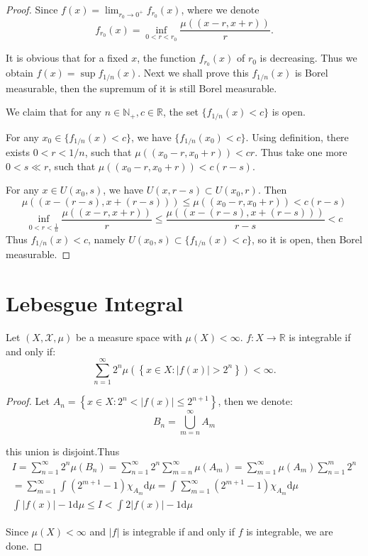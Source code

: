 \begin{proof}
	Since $ f(x)=\lim_{r_{0}\to 0^{+}}f_{r_{0}}( x ) $, where we denote
	$$ f_{r_{0}}( x ) =\inf_{0<r<r_{0}}\frac{\mu ( ( x-r,x+r ) )}{r}.
	$$

	It is obvious that for a fixed $ x $, the function $ f_{r_{0}}(x) $ of $ r_{0} $ is decreasing. Thus we obtain $
		f( x ) =\sup f_{1/n}( x )
	$. Next we shall prove this $ f_{1/n}(x) $ is Borel measurable, then the supremum of it is still Borel measurable.

	We claim that for any $ n\in \mathbb{N}_{+},c\in \mathbb{R} $, the set $ \{f_{1/n}(x)<c\} $ is open.

	For any $ x_{0}\in \{f_{1/n}(x)<c\} $, we have $ \{f_{1/n}(x_{0})<c\} $.
	Using definition, there exists $ 0<r<1/n $, such that $ \mu((x_{0}-r,x_{0}+r))<cr $.
	Thus take  one more $ 0<s \ll r $, such that $ \mu((x_{0}-r,x_{0}+r))<c(r-s) $.

	For any $ x\in U(x_{0},s) $, we have $ U(x,r-s)\subset U(x_{0},r) $. Then
	$$ \mu((x-(r-s),x+(r-s)))\le \mu((x_{0}-r,x_{0}+r))<c(r-s) $$
	$$
		\inf_{0<r<\frac{1}{n}}\frac{\mu ( ( x-r,x+r ) )}{r}\le \frac{\mu ( ( x-( r-s ) ,x+( r-s ) ) )}{r-s}<c
	$$
	Thus $ f_{1/n}(x)<c $, namely $
		U( x_0,s ) \subset \{ f_{1/n}( x ) <c \}
	$, so it is open, then Borel measurable.
\end{proof}

\section*{Lebesgue Integral}

\begin{problem}
Let $ (X,\mathcal{X} ,\mu) $ be a measure space with $ \mu(X)<\infty $. $ f\colon X\to \mathbb{R}  $ is integrable if and only if:
$$
	\sum_{n=1}^{\infty}{2^n\mu ( \left\{ x\in X:|f( x ) |>2^n \right\} )}<\infty.
$$
\end{problem}

\begin{proof}
	Let $
		A_n=\left\{ x\in X:2^n<|f( x ) |\le 2^{n+1} \right\}
	$, then we denote:
	$$
		B_n=\bigcup_{m=n}^{\infty}{A_m}
	$$

	this union is disjoint.Thus
	\begin{gather*}
		I=\sum_{n=1}^{\infty}{2^n\mu ( B_n )}=\sum_{n=1}^{\infty}{2^n\sum_{m=n}^{\infty}{\mu ( A_m )}}=\sum_{m=1}^{\infty}{\mu ( A_m ) \sum_{n=1}^m{2^n}}
		\\
		=\sum_{m=1}^{\infty}{\int_{}^{}{( 2^{m+1}-1 ) \chi _{A_m}\mathrm{d}\mu}}=\int_{}^{}{\sum_{m=1}^{\infty}{( 2^{m+1}-1 ) \chi _{A_m}}\mathrm{d}\mu}
		\\
		\int_{}^{}{|f( x ) |-1\mathrm{d}\mu}\le I<\int_{}^{}{2|f( x ) |-1\mathrm{d}\mu}
	\end{gather*}

	Since $ \mu(X)<\infty $ and  $ |f| $ is integrable if and only if $ f $ is integrable, we are done.
\end{proof}

